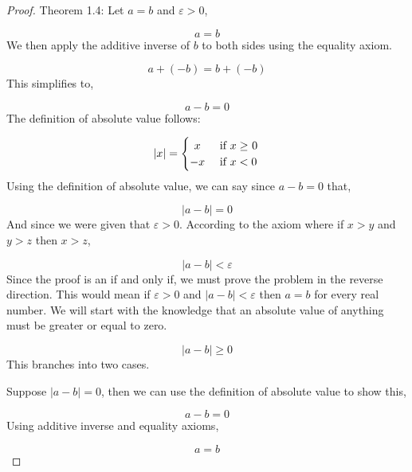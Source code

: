 \documentclass[a4paper, 12pt]{article}
\begin{document}
\begin{proof}
Theorem 1.4: Let \(a=b\) and \(\varepsilon > 0\),

\begin{equation}
a=b
\end{equation}
We then apply the additive inverse of \(b\) to both sides using the equality axiom.

\begin{equation}
a+(-b) = b + (-b)
\end{equation}
This simplifies to, 


\begin{equation}
a - b = 0
\end{equation}
The definition of absolute value follows:

\[
 \abs{x}  =
  \begin{cases} 
      \hfill x    \hfill & \text{ if $x \geq$ 0} \\
      \hfill -x \hfill & \text{ if $x < 0 $} \\
  \end{cases}
\]
Using the definition of absolute value, we can say since \(a-b = 0\) that,

\begin{equation}
|a-b| = 0
\end{equation}
And since we were given that \( \varepsilon > 0\). According to the axiom where if \(x > y\) and \(y > z\) then \(x > z\), 

\begin{equation}
|a-b| < \varepsilon
\end{equation}
Since the proof is an if and only if, we must prove the problem in the reverse direction. This would mean if \(\varepsilon > 0\) and \(|a-b|<\varepsilon\) then \(a=b\) for every real number. We will start with the knowledge that an absolute value of anything must be greater or equal to zero.

\begin{equation}
%
% 
%
|a-b| \geq 0
\end{equation}
This branches into two cases. \newline

Suppose \(|a-b| = 0\), then we can use the definition of absolute value to show this,

\begin{equation}
a-b = 0
\end{equation}
Using additive inverse and equality axioms,

\begin{equation}
a=b
\end{equation}


\end{proof}
\end{document}

